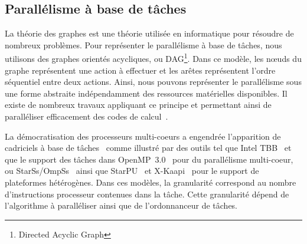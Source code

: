 \subsection{Parallélisme à base de tâches}
La théorie des graphes est une théorie utilisée en informatique pour résoudre de nombreux problèmes.
%
%
%
Pour représenter le parallélisme à base de tâches, nous utilisons des graphes orientés acycliques, ou DAG\footnote{Directed Acyclic Graph}.
%
Dans ce modèle, les n{\oe}uds du graphe représentent une action à effectuer et les arêtes représentent l'ordre séquentiel entre deux actions.
%
Ainsi, nous pouvons représenter le parallélisme sous une forme abstraite indépendamment des ressources matérielles disponibles.
%
Il existe de nombreux travaux appliquant ce principe et permettant ainsi de paralléliser efficacement des codes de calcul~\cite{BBAC2014}.


La démocratisation des processeurs multi-coeurs a engendrée l'apparition de cadriciels à base de tâches~\cite{taskscomparison} comme illustré par des outils tel que Intel TBB~\cite{Intel::TBB} et que le support des tâches dans OpenMP~3.0~\cite{openmptasks} pour du parallélisme multi-coeur, ou StarSs/OmpSs~\cite{OMPSs} ainsi que StarPU~\cite{starpu} et X-Kaapi~\cite{xkaapi} pour le support de plateformes hétérogènes.
%
Dans ces modèles, la granularité correspond au nombre d'instructions processeur contenues dans la tâche.
%
Cette granularité dépend de l'algorithme à paralléliser ainsi que de l'ordonnanceur de tâches.

